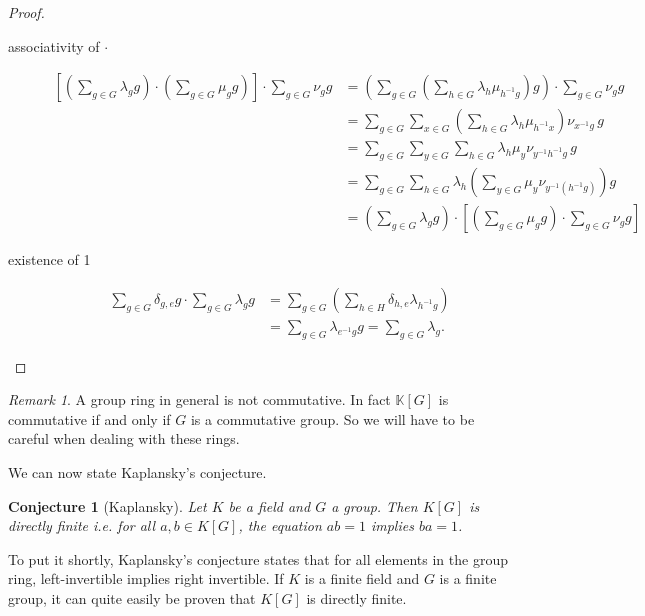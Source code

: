 \documentclass[titlepage, a4paper]{article}
\newtheorem{conjecture}{Conjecture}
\theoremstyle{remark}
\newtheorem{remark}{Remark}
\begin{document}
\begin{proof}
\begin{description}
    \item[associativity of $\cdot$]
    \begin{align*}
    \left[\left(\sum_{g \in G} \lambda_g g \right) \cdot \left(\sum_{g \in G} \mu_g g \right)\right ] \cdot \sum_{g \in G} \nu_g g
    &= \left(\sum_{g \in G} \left( \sum_{h \in G} \lambda_{h} \mu_{h^{-1}g} \right) g \right) \cdot \sum_{g \in G} \nu_g g\\
    &= \sum_{g \in G} \sum_{x \in G} \left( \sum_{h \in G} \lambda_{h} \mu_{h^{-1}x} \right) \nu_{x^{-1}g} \,g \\
    &= \sum_{g \in G} \sum_{y \in G} \sum_{h \in G} \lambda_{h} \mu_{y} \nu_{y^{-1} h^{-1}g} \, g \\
    &= \sum_{g \in G} \sum_{h \in G} \lambda_h \left(\sum_{y \in G}\mu_{y} \nu_{y^{-1} (h^{-1}g)}\right)g \\
    &= \left(\sum_{g \in G} \lambda_g g \right) \cdot \left[ \left(\sum_{g \in G} \mu_g g \right) \cdot \sum_{g \in G} \nu_g g \right]
    \end{align*}

    \item[existence of 1]
    \begin{align*}
    \sum_{g \in G} \delta_{g,e} g \cdot \sum_{g \in G} \lambda_g g
    &= \sum_{g \in G} \left(\sum_{h \in H} \delta_{h,e} \lambda_{h^{-1}g} \right) \\
    &= \sum_{g \in G} \lambda_{e^{-1}g} g = \sum_{g \in G} \lambda_g.
    \end{align*}
    
        
    \end{description}
\end{proof}

\begin{remark}
	A group ring in general is not commutative. In fact $\mathbb{K}[G]$ is commutative if and only if $G$ is a commutative group. So we will have to be careful when dealing with these rings. 
\end{remark}
We can now state Kaplansky's conjecture.

\begin{conjecture}[Kaplansky]
    Let $K$ be a field and $G$ a group. Then $K[G]$ is directly finite i.e. for all $a, b \in K[G]$, the equation $ab=1$ implies $ba=1$.
\end{conjecture}

To put it shortly, Kaplansky's conjecture states that for all elements in the group ring, left-invertible implies right invertible. If $K$ is a finite field and $G$ is a finite group, it can quite easily be proven that $K[G]$ is directly finite.
\end{document}
